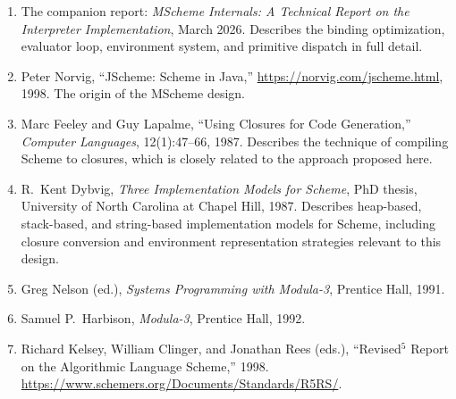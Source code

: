 \documentclass[12pt]{report}
\begin{document}
\begin{enumerate}
\item The companion report: \emph{MScheme Internals: A Technical
  Report on the Interpreter Implementation}, March 2026.  Describes
  the binding optimization, evaluator loop, environment system, and
  primitive dispatch in full detail.

\item Peter Norvig, ``JScheme: Scheme in Java,''
  \url{https://norvig.com/jscheme.html}, 1998.
  The origin of the MScheme design.

\item Marc Feeley and Guy Lapalme, ``Using Closures for Code
  Generation,'' \emph{Computer Languages}, 12(1):47--66, 1987.
  Describes the technique of compiling Scheme to closures, which is
  closely related to the approach proposed here.

\item R.\ Kent Dybvig, \emph{Three Implementation Models for Scheme},
  PhD thesis, University of North Carolina at Chapel Hill, 1987.
  Describes heap-based, stack-based, and string-based implementation
  models for Scheme, including closure conversion and environment
  representation strategies relevant to this design.

\item\label{ref:nelson} Greg Nelson (ed.), \emph{Systems Programming with Modula-3},
  Prentice Hall, 1991.

\item Samuel P.\ Harbison, \emph{Modula-3}, Prentice Hall, 1992.

\item Richard Kelsey, William Clinger, and Jonathan Rees (eds.),
  ``Revised$^5$ Report on the Algorithmic Language Scheme,'' 1998.
  \url{https://www.schemers.org/Documents/Standards/R5RS/}.
\end{enumerate}
\end{document}
